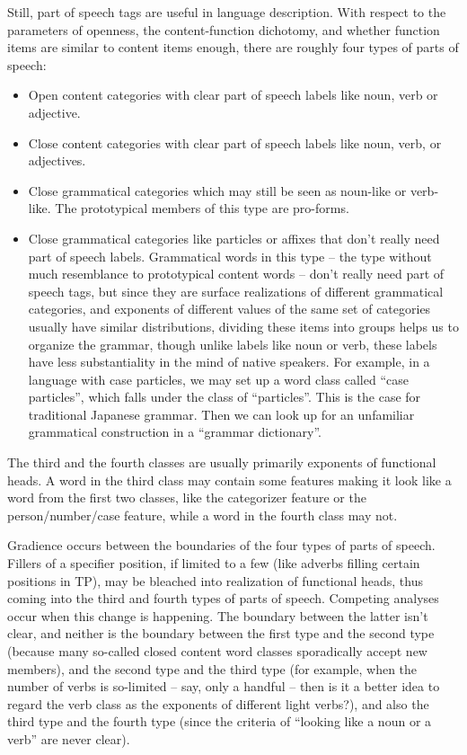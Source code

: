 \documentclass[UTF8, a4paper, oneside, scheme=plain, 12pt]{ctexbook}
\begin{document}
{Still, part of speech tags are useful in language description.
With respect to the parameters of 
openness, the content-function dichotomy,
and whether function items are similar to content items enough,
there are roughly four types of parts of speech:
\begin{itemize}
    \item Open content categories with clear part of speech labels like noun, verb or adjective.
    \item Close content categories with clear part of speech labels like noun, verb, or adjectives.
    \item Close grammatical categories which may still be seen as noun-like or verb-like. 
    The prototypical members of this type are pro-forms.
    \item Close grammatical categories like particles or affixes that don't really need part of speech labels.
    Grammatical words in this type -- the type without much resemblance to prototypical content words -- 
    don't really need part of speech tags,
    but since they are surface realizations of different grammatical categories,
    and exponents of different values of the same set of categories 
    usually have similar distributions,
    dividing these items into groups helps us to organize the grammar,
    though unlike labels like noun or verb,
    these labels have less substantiality in the mind of native speakers.
    For example, in a language with case particles,
    we may set up a word class called ``case particles'',
    which falls under the class of ``particles''.
    This is the case for traditional Japanese grammar.
    Then we can look up for an unfamiliar grammatical construction 
    in a ``grammar dictionary''.
\end{itemize}

The third and the fourth classes are usually primarily exponents of functional heads.
A word in the third class may contain some features making it look like a word from the first two classes,
like the categorizer feature or the person/number/case feature,
while a word in the fourth class may not.

Gradience occurs between the boundaries of the four types of parts of speech.
Fillers of a specifier position,
if limited to a few (like adverbs filling certain positions in TP),
may be bleached into realization of functional heads,
thus coming into the third and fourth types of parts of speech.
Competing analyses occur when this change is happening.
The boundary between the latter isn't clear,
and neither is the boundary between the first type and the second type
(because many so-called closed content word classes 
sporadically accept new members),
and the second type and the third type
(for example, when the number of verbs is so-limited -- say, only a handful -- 
then is it a better idea to regard the verb class as the exponents of different light verbs?),
and also the third type and the fourth type
(since the criteria of ``looking like a noun or a verb'' are never clear).

}
\end{document}
